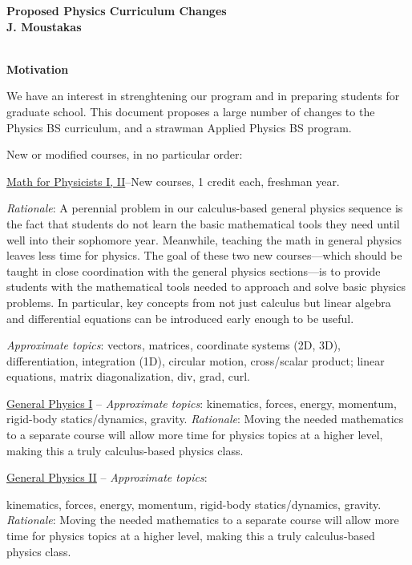 \documentclass[12pt,preprint]{aastex}
\begin{document}
\vspace*{-1.2in} 
\begin{center}
{\Large {\bf\sc Proposed Physics Curriculum Changes}} \\
\vspace*{2mm} 
{\bf\sc J. Moustakas} \\
\vspace*{2mm} 
 \\
\vspace*{0.1in} 
\end{center}

{\large \sc \textbf{Motivation}}
\vspace{-1mm}

We have an interest in strenghtening our program and in preparing students for
graduate school.  This document proposes a large number of changes to the
Physics BS curriculum, and a strawman Applied Physics BS program.

New or modified courses, in no particular order:
\begin{itemize*}
\item{\underline{Math for Physicists I, II}--New courses, 1 credit each,
  freshman year. 
  \begin{itemize*}
    \item{{\em Rationale}: A perennial problem in our calculus-based general
      physics sequence is the fact that students do not learn the basic
      mathematical tools they need until well into their sophomore year.
      Meanwhile, teaching the math in general physics leaves less time for
      physics.  The goal of these two new courses---which should be taught in
      close coordination with the general physics sections---is to provide
      students with the mathematical tools needed to approach and solve basic
      physics problems.  In particular, key concepts from not just calculus but
      linear algebra and differential equations can be introduced early enough
      to be useful.}
    \item{{\em Approximate topics}: vectors, matrices, coordinate systems (2D,
      3D), differentiation, integration (1D), circular motion, cross/scalar
      product; linear equations, matrix diagonalization, div, grad, curl.}
  \end{itemize*}
}
\item{\underline{General Physics I} -- {\em Approximate topics}: kinematics,
  forces, energy, momentum, rigid-body statics/dynamics, gravity.  {\em
    Rationale}: Moving the needed mathematics to a separate course will allow
  more time for physics topics at a higher level, making this a truly
  calculus-based physics class.}
\item{\underline{General Physics II} -- {\em Approximate topics}: 

kinematics,
  forces, energy, momentum, rigid-body statics/dynamics, gravity.  {\em
    Rationale}: Moving the needed mathematics to a separate course will allow
  more time for physics topics at a higher level, making this a truly
  calculus-based physics class.}
\end{itemize*}
\end{document}
